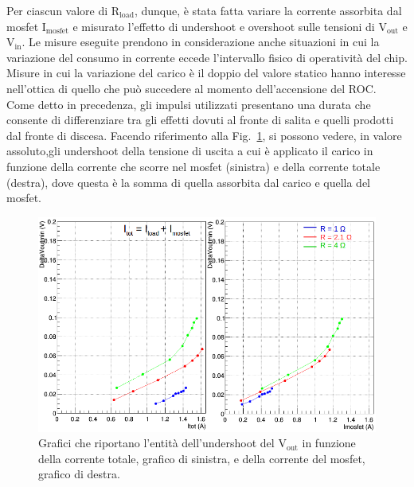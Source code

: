 Per ciascun valore di $\mathrm{R_{load}}$, dunque, è stata fatta variare la corrente assorbita dal mosfet $\mathrm{I_{mosfet}}$ e misurato l'effetto di undershoot e overshoot sulle tensioni di $\mathrm{V_{out}}$ e $\mathrm{V_{in}}$. 
Le misure eseguite prendono in considerazione anche situazioni in cui la variazione del consumo in corrente eccede l'intervallo fisico di operatività del chip. Misure in cui la variazione del carico è il doppio del valore statico hanno interesse nell'ottica di quello che può succedere al momento dell'accensione del ROC.%
Come detto in precedenza, gli impulsi utilizzati presentano una durata che consente di differenziare tra gli effetti dovuti al fronte di salita e quelli prodotti dal fronte di discesa. 
Facendo riferimento alla Fig.~\ref{VoutUnd}, si possono vedere, in valore assoluto,gli undershoot della tensione di uscita a cui è applicato il carico in funzione della corrente che scorre nel mosfet (sinistra) e della corrente totale (destra), dove questa è la somma di quella assorbita dal carico e quella del mosfet. 
\begin{figure}
\centering
\includegraphics[width=0.9\linewidth]{Immagini/VoutUnd}
\caption{Grafici che riportano l'entità dell'undershoot del $\mathrm{V_{out}}$ in funzione della corrente totale, grafico di sinistra, e della corrente del mosfet, grafico di destra.}
\label{VoutUnd}
\end{figure}
